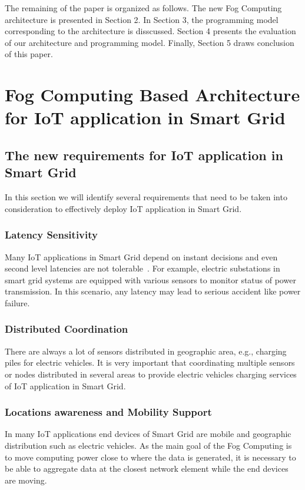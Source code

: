 \documentclass[conference]{IEEEtran}
\begin{document}
The remaining of the paper is organized as follows. The new Fog Computing architecture is presented in Section 2. In Section 3, the programming model corresponding to the architecture is disscussed. Section 4 presents the evaluation of our architecture and programming model. Finally, Section 5 draws conclusion of this paper.

\section{Fog Computing Based Architecture for IoT application in Smart Grid}
\subsection{The new requirements for IoT application in Smart Grid}
In this section we will identify several requirements that
need to be taken into consideration to effectively deploy IoT
application in Smart Grid.
\subsubsection{Latency Sensitivity} Many IoT applications in Smart Grid  depend on instant decisions and even second level latencies are not tolerable~\cite{Chen2017}. For example, electric substations in smart grid systems are equipped with various sensors to monitor status of power transmission. In this scenario, any latency may lead to serious accident like power failure.
\subsubsection{Distributed Coordination} There are always a lot of sensors distributed in geographic area, e.g., charging piles for electric vehicles. It is very important that coordinating multiple sensors or nodes distributed in several areas to provide electric vehicles charging services of IoT application in Smart Grid. 
\subsubsection{Locations awareness and Mobility Support} In many IoT applications end devices of Smart Grid are mobile and geographic distribution such as electric vehicles. As the main goal of the Fog Computing is to move computing power close to where the data is generated, it is necessary to be able to aggregate data at the closest network element while the end devices are moving.
\end{document}
